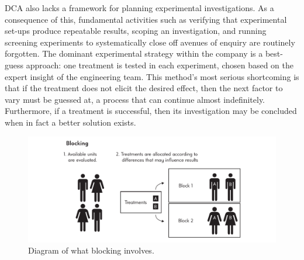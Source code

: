 \documentclass[11pt,a4paper,article]{memoir} %
\begin{document}
\par
DCA also lacks a framework for planning experimental investigations. As a consequence of this, fundamental activities such as verifying that experimental set-ups produce repeatable results, scoping an investigation, and running screening experiments to systematically close off avenues of enquiry are routinely forgotten. The dominant experimental strategy within the company is a best-guess approach: one treatment is tested in each experiment, chosen based on the expert insight of the engineering team. This method's most serious shortcoming is that if the treatment does not elicit the desired effect, then the next factor to vary must be guessed at, a process that can continue almost indefinitely. Furthermore, if a treatment is successful, then its investigation may be concluded when in fact a better solution exists.
\par
\begin{figure}
\includegraphics[width=\textwidth]{Blocking.pdf}
\caption{Diagram of what blocking involves.}
\label{fig:blocking}
\end{figure}
\par
\end{document}
